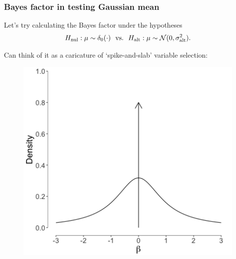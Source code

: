 \documentclass[18pt]{beamer}
\newcommand{\defineTightSpacing}{%
	\setlength{\abovedisplayskip}{.25\baselineskip}%
	\setlength{\belowdisplayskip}{.25\baselineskip}%
}
\newcommand{\normalDist}{\operatorname{\mathcal{N}}}
\newcommand{\hypothesis}{H}
\newcommand{\nullSub}{\mathrm{nul}}
\newcommand{\altSub}{\mathrm{alt}}
\begin{document}
\begin{frame}
\frametitle{Bayes factor in testing Gaussian mean}
Let's try calculating the Bayes factor under the hypotheses
\begin{equation*} \defineTightSpacing%
\hypothesis_\nullSub: \mu \sim \delta_0(\cdot) 
	\ \text{ vs.\ } \ 
	\hypothesis_\altSub: \mu \sim \normalDist(0, \sigma_\altSub^2).
\end{equation*}

\pause
Can think of it as a caricature of `spike-and-slab' variable selection:
\vspace*{-1.2\baselineskip}%
\begin{figure}
\centering
\includegraphics[height=.5\paperheight]{Figure/spike_and_slab}
\end{figure}

\end{frame}
\end{document}
